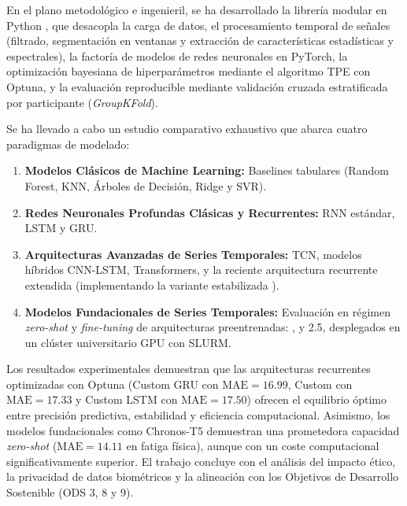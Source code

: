 En el plano metodológico e ingenieril, se ha desarrollado la librería modular en Python , que desacopla la carga de datos, el procesamiento temporal de señales (filtrado, segmentación en ventanas y extracción de características estadísticas y espectrales), la factoría de modelos de redes neuronales en PyTorch, la optimización bayesiana de hiperparámetros mediante el algoritmo TPE con Optuna, y la evaluación reproducible mediante validación cruzada estratificada por participante (\textit{GroupKFold}).

Se ha llevado a cabo un estudio comparativo exhaustivo que abarca cuatro paradigmas de modelado:
\begin{enumerate}
    \item \textbf{Modelos Clásicos de Machine Learning:} Baselines tabulares (Random Forest, KNN, Árboles de Decisión, Ridge y SVR).
    \item \textbf{Redes Neuronales Profundas Clásicas y Recurrentes:} RNN estándar, LSTM y GRU.
    \item \textbf{Arquitecturas Avanzadas de Series Temporales:} TCN, modelos híbridos CNN-LSTM, Transformers, \patchtst{} y la reciente arquitectura recurrente extendida \xlstm{} (implementando la variante estabilizada \slstm{}).
    \item \textbf{Modelos Fundacionales de Series Temporales:} Evaluación en régimen \textit{zero-shot} y \textit{fine-tuning} de arquitecturas preentrenadas: \moment{}, \chronos{} y \timesfm{} 2.5, desplegados en un clúster universitario GPU con SLURM.
\end{enumerate}

Los resultados experimentales demuestran que las arquitecturas recurrentes optimizadas con Optuna (Custom GRU con $\text{MAE}=16.99$, Custom \xlstm{} con $\text{MAE}=17.33$ y Custom LSTM con $\text{MAE}=17.50$) ofrecen el equilibrio óptimo entre precisión predictiva, estabilidad y eficiencia computacional. Asimismo, los modelos fundacionales como Chronos-T5 demuestran una prometedora capacidad \textit{zero-shot} ($\text{MAE}=14.11$ en fatiga física), aunque con un coste computacional significativamente superior. El trabajo concluye con el análisis del impacto ético, la privacidad de datos biométricos y la alineación con los Objetivos de Desarrollo Sostenible (ODS 3, 8 y 9).

\clearpage

\thispagestyle{empty}


